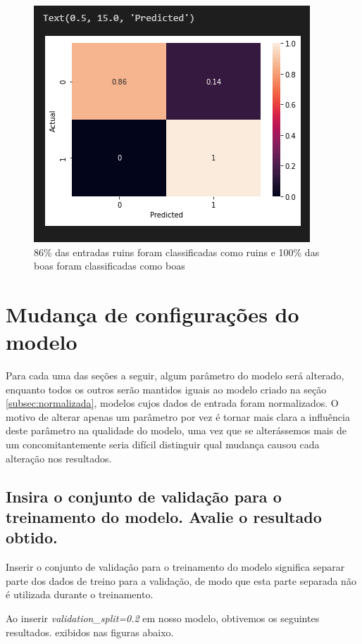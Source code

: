 \documentclass[12pt]{article}
\begin{document}
\begin{figure}[H]
	\centering
	\includegraphics[width=0.7\linewidth]{Imagens/ConfusionMatrizNormalizado}
	\caption{86\% das entradas ruins foram classificadas como ruins e 100\% das boas foram classificadas como boas}
	\label{fig:confusionmatriznormalizado}
\end{figure}

 
\section{Mudança de configurações do modelo}

Para cada uma das seções a seguir, algum parâmetro do modelo será alterado, enquanto todos os outros serão mantidos iguais ao modelo criado na seção \ref{subsec:normalizada}, modelos cujos dados de entrada foram normalizados. O motivo de alterar apenas um parâmetro por vez é tornar mais clara a influência deste parâmetro na qualidade do modelo, uma vez que se alterássemos mais de um concomitantemente seria difícil distinguir qual mudança causou cada alteração nos resultados.

\subsection{Insira o conjunto de validação para o treinamento do modelo. Avalie o resultado obtido.}

Inserir o conjunto de validação para o treinamento do modelo significa separar parte dos dados de treino para a validação, de modo que esta parte separada não é utilizada durante o treinamento.

Ao inserir \textit{validation\_split=0.2} em nosso modelo, obtivemos os seguintes resultados. exibidos nas figuras abaixo.
\end{document}
